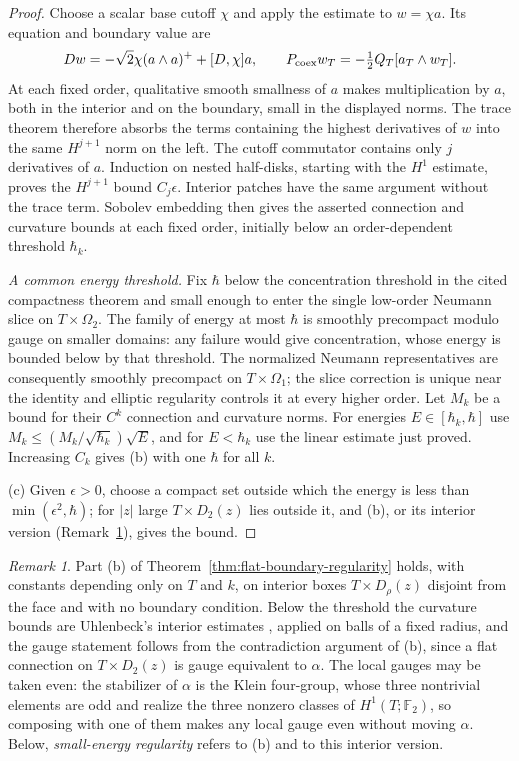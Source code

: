 \documentclass[11pt]{amsart}
\theoremstyle{definition}
\theoremstyle{remark}
\newtheorem{remark}[theorem]{Remark}
\theoremstyle{plain}
\numberwithin{equation}{section}
\newcommand{\FF}{\mathbb{F}_2}
\begin{document}
\begin{proof}
Choose a scalar base cutoff $\chi$ and apply the estimate to
$w=\chi a$. Its equation and boundary value are
\[
Dw=-\sqrt2\chi(a\wedge a)^++[D,\chi]a,
\qquad P_{\rm coex}w_T=-\tfrac12Q_T[a_T\wedge w_T].
\]
At each fixed order, qualitative smooth smallness of $a$ makes
multiplication by $a$, both in the interior and on the boundary,
small in the displayed norms. The trace theorem therefore absorbs
the terms containing the highest derivatives of $w$ into the same
$H^{j+1}$ norm on the left. The cutoff commutator contains only
$j$ derivatives of $a$. Induction on nested half-disks, starting
with the $H^1$ estimate, proves the $H^{j+1}$ bound $C_j\epsilon$.
Interior patches have the same argument without the trace term.
Sobolev embedding then gives the asserted connection and curvature
bounds at each fixed order, initially below an order-dependent
threshold $\hbar_k$.

\emph{A common energy threshold.} Fix $\hbar$ below the concentration
threshold in the cited compactness theorem and small enough to
enter the single low-order Neumann slice on $T\times\Omega_2$.
The family of energy at most $\hbar$ is smoothly precompact modulo
gauge on smaller domains: any failure would give concentration,
whose energy is bounded below by that threshold. The normalized
Neumann representatives are consequently smoothly precompact on
$T\times\Omega_1$; the slice correction is unique near the identity
and elliptic regularity controls it at every higher order. Let
$M_k$ be a bound for their $C^k$ connection and curvature norms.
For energies $E\in[\hbar_k,\hbar]$ use
$M_k\le(M_k/\sqrt{\hbar_k})\sqrt E$, and for $E<\hbar_k$ use the
linear estimate just proved. Increasing $C_k$ gives (b) with one
$\hbar$ for all $k$.

(c) Given $\epsilon>0$, choose a compact set outside which the energy is less than
$\min(\epsilon^2,\hbar)$; for $|z|$ large $T\times D_2(z)$ lies outside it, and (b), or its
interior version (Remark~\ref{rem:interior-boxes}), gives the bound.
\end{proof}

\begin{remark}\label{rem:interior-boxes}
Part (b) of Theorem~\ref{thm:flat-boundary-regularity} holds, with constants
depending only on $T$ and $k$, on interior boxes $T\times D_\rho(z)$ disjoint
from the face and with no boundary condition. Below the threshold the curvature
bounds are Uhlenbeck's interior estimates \cite[Section~2.3]{Donaldson-book},
applied on balls of a fixed radius, and the gauge statement follows from the
contradiction argument of (b), since a flat connection on $T\times D_2(z)$ is
gauge equivalent to $\alpha$. The local gauges may be taken even: the stabilizer of
$\alpha$ is the Klein four-group, whose three nontrivial elements are odd and realize
the three nonzero classes of $H^1(T;\FF)$, so composing with one of them makes any
local gauge even without moving $\alpha$. Below, \emph{small-energy regularity} refers to (b)
and to this interior version.
\end{remark}
\end{document}
